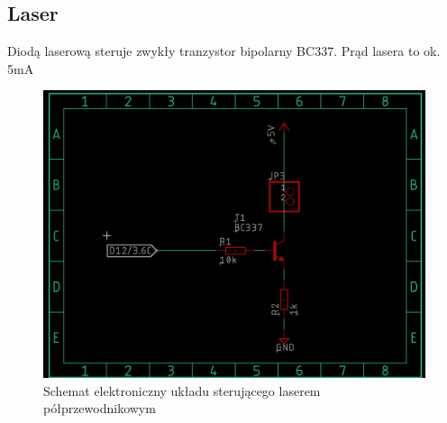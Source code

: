 \documentclass{report}
\begin{document}
    	\subsection{Laser}
		Diodą laserową steruje zwykły tranzystor bipolarny BC337. Prąd lasera to ok. 5mA
        \begin{figure}[H]
			\centering
			\includegraphics[scale=0.4]{eagle_2.png}
			\caption{Schemat elektroniczny układu sterującego laserem półprzewodnikowym}
		\end{figure}
\end{document}
